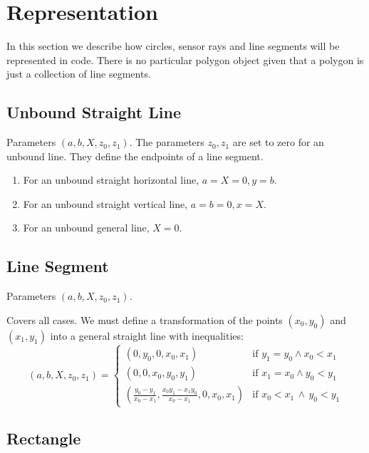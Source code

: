 \documentclass[11pt]{article}
\begin{document}
\section{Representation}
\label{sec-representation}
In this section we describe how circles, sensor rays and line segments will be
represented in code. There is no particular polygon object given that a
polygon is just a collection of line segments.

\subsection{Unbound Straight Line}


Parameters $(a, b, X, z_0, z_1)$.
The parameters $z_0, z_1$ are set to zero for an unbound line. They define
the endpoints of a line segment.

\begin{enumerate}
    \item For an unbound straight horizontal line, $a=X=0, y=b$.
    \item For an unbound straight vertical line, $a=b=0, x=X$.
    \item For an unbound general line, $X=0$.
\end{enumerate}

\subsection{Line Segment}
\label{sec-representation-line-segment}

Parameters $(a, b, X, z_0, z_1)$.

Covers all cases. We must define a transformation of the points $(x_0, y_0)$
and $(x_1, y_1)$  into a general straight line with inequalities:
\begin{equation}
    (a, b, X, z_0, z_1) =
    \begin{cases}
        (0, y_0, 0, x_0, x_1)  &
        \text{if $y_1 = y_0\land x_0 < x_1$}\\
        (0, 0, x_0, y_0, y_1) &
        \text{if $x_1 = x_0\land  y_0 < y_1 $}\\
        \left(\frac{y_0 - y_1}{x_0-x_1},
            \frac{x_0 y_1 - x_1 y_0}{x_0 - x_1}, 0, x_0, x_1\right) &
            \text{if $x_0< x_1\,\land\,y_0< y_1$}
    \end{cases}
\end{equation}

\subsection{Rectangle}
\end{document}
